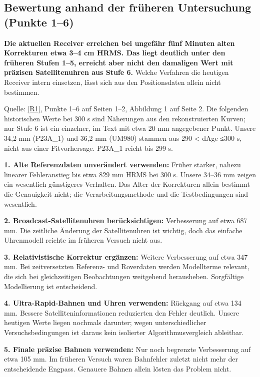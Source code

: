\documentclass[11pt,a4paper]{article}
\numberwithin{equation}{section}
\numberwithin{figure}{section}
\begin{document}
\subsection{Bewertung anhand der früheren Untersuchung (Punkte 1–6)}

\textbf{Die aktuellen Receiver erreichen bei ungefähr fünf Minuten alten Korrekturen etwa 3–4 cm HRMS. Das liegt deutlich unter den früheren Stufen 1–5, erreicht aber nicht den damaligen Wert mit präzisen Satellitenuhren aus Stufe 6.} Welche Verfahren die heutigen Receiver intern einsetzen, lässt sich aus den Positionsdaten allein nicht bestimmen.

Quelle: \hyperlink{ref-R1}{[R1]}, Punkte 1–6 auf Seiten 1–2, Abbildung 1 auf Seite 2. Die folgenden historischen Werte bei 300 s sind Näherungen aus den rekonstruierten Kurven; nur Stufe 6 ist ein einzelner, im Text mit etwa 20 mm angegebener Punkt. Unsere 34,2 mm (P23A\_1) und 36,2 mm (UM980) stammen aus 290 < dAge ≤300 s, nicht aus einer Fitvorhersage. P23A\_1 reicht bis 299 s.

\textbf{1. Alte Referenzdaten unverändert verwenden:} Früher starker, nahezu linearer Fehleranstieg bis etwa 829 mm HRMS bei 300 s. Unsere 34–36 mm zeigen ein wesentlich günstigeres Verhalten. Das Alter der Korrekturen allein bestimmt die Genauigkeit nicht; die Verarbeitungsmethode und die Testbedingungen sind wesentlich.

\textbf{2. Broadcast-Satellitenuhren berücksichtigen:} Verbesserung auf etwa 687 mm. Die zeitliche Änderung der Satellitenuhren ist wichtig, doch das einfache Uhrenmodell reichte im früheren Versuch nicht aus.

\textbf{3. Relativistische Korrektur ergänzen:} Weitere Verbesserung auf etwa 347 mm. Bei zeitversetzten Referenz- und Roverdaten werden Modellterme relevant, die sich bei gleichzeitigen Beobachtungen weitgehend herausheben. Sorgfältige Modellierung ist entscheidend.

\textbf{4. Ultra-Rapid-Bahnen und Uhren verwenden:} Rückgang auf etwa 134 mm. Bessere Satelliteninformationen reduzierten den Fehler deutlich. Unsere heutigen Werte liegen nochmals darunter; wegen unterschiedlicher Versuchsbedingungen ist daraus kein isolierter Algorithmusvergleich ableitbar.

\textbf{5. Finale präzise Bahnen verwenden:} Nur noch begrenzte Verbesserung auf etwa 105 mm. Im früheren Versuch waren Bahnfehler zuletzt nicht mehr der entscheidende Engpass. Genauere Bahnen allein lösten das Problem nicht.
\end{document}
